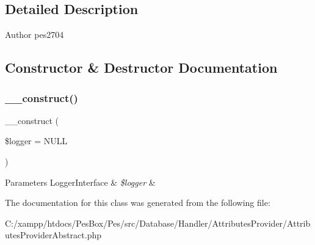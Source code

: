 \subsection{Detailed Description}
\begin{DoxyAuthor}{Author}
pes2704 
\end{DoxyAuthor}


\subsection{Constructor \& Destructor Documentation}
\mbox{\label{class_pes_1_1_database_1_1_handler_1_1_attributes_provider_1_1_attributes_provider_abstract_a4d086b03f47931c183f0414bf2da5103}} 
\subsubsection{\texorpdfstring{\+\_\+\+\_\+construct()}{\_\_construct()}}
{\footnotesize\ttfamily \+\_\+\+\_\+construct (\begin{DoxyParamCaption}\item[{Logger\+Interface}]{\$logger = {\ttfamily NULL} }\end{DoxyParamCaption})}


\begin{DoxyParams}[1]{Parameters}
Logger\+Interface & {\em \$logger} & \\
\hline
\end{DoxyParams}


The documentation for this class was generated from the following file\+:\begin{DoxyCompactItemize}
\item 
C\+:/xampp/htdocs/\+Pes\+Box/\+Pes/src/\+Database/\+Handler/\+Attributes\+Provider/Attributes\+Provider\+Abstract.\+php\end{DoxyCompactItemize}
